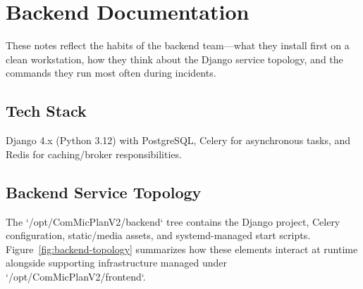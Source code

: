 \documentclass[11pt]{article}
\begin{document}
\section{Backend Documentation}
\noindent These notes reflect the habits of the backend team—what they install first on a clean workstation, how they think about the Django service topology, and the commands they run most often during incidents.
\subsection{Tech Stack}
Django 4.x (Python 3.12) with PostgreSQL, Celery for asynchronous tasks, and Redis for caching/broker responsibilities.

\subsection{Backend Service Topology}
The `/opt/ComMicPlanV2/backend` tree contains the Django project, Celery configuration, static/media assets, and systemd-managed start scripts. Figure~\ref{fig:backend-topology} summarizes how these elements interact at runtime alongside supporting infrastructure managed under `/opt/ComMicPlanV2/frontend`.
\end{document}
